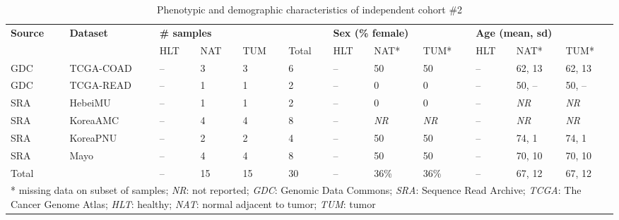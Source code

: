 \begin{table}[ht]
    \small
    \centering
    \caption{Phenotypic and demographic characteristics of independent cohort \#2}
    \label{tab:ind2}
    \begin{tabular}{ll|llll|lll|lll}
        \textbf{Source} & \textbf{Dataset} & \multicolumn{4}{l|}{\textbf{\# samples}} & \multicolumn{3}{l|}{\textbf{Sex (\% female)}} & \multicolumn{3}{l}{\textbf{Age (mean, sd)}} \\
        \cline{3-12}
         & & HLT & NAT & TUM & Total & HLT & NAT* & TUM* & HLT & NAT* & TUM* \\
        \hline
        GDC & TCGA-COAD & -- & 3 & 3 & 6 & -- & 50 & 50 & -- & 62, 13 & 62, 13 \\
        GDC & TCGA-READ & -- & 1 & 1 & 2 & -- & 0 & 0 & -- & 50, -- & 50, -- \\
        SRA & HebeiMU & -- & 1 & 1 & 2 & -- & 0 & 0 & -- & \emph{NR} & \emph{NR} \\
        SRA & KoreaAMC & -- & 4 & 4 & 8 & -- & \emph{NR} & \emph{NR} & -- & \emph{NR} & \emph{NR} \\
        SRA & KoreaPNU & -- & 2 & 2 & 4 & -- & 50 & 50 & -- & 74, 1 & 74, 1 \\
        SRA & Mayo & -- & 4 & 4 & 8 & -- & 50 & 50 & -- & 70, 10 & 70, 10 \\
        \hline
        Total &  & -- & 15 & 15 & 30 & -- & 36\% & 36\% & -- & 67, 12 & 67, 12 \\
        \hline
        \multicolumn{12}{l}{* missing data on subset of samples; \emph{NR}: not reported; \emph{GDC}: Genomic Data Commons; \emph{SRA}: Sequence Read Archive; \emph{TCGA}: The Cancer Genome Atlas; \emph{HLT}: healthy; \emph{NAT}: normal adjacent to tumor; \emph{TUM}: tumor} \\
    \end{tabular}
\end{table}

